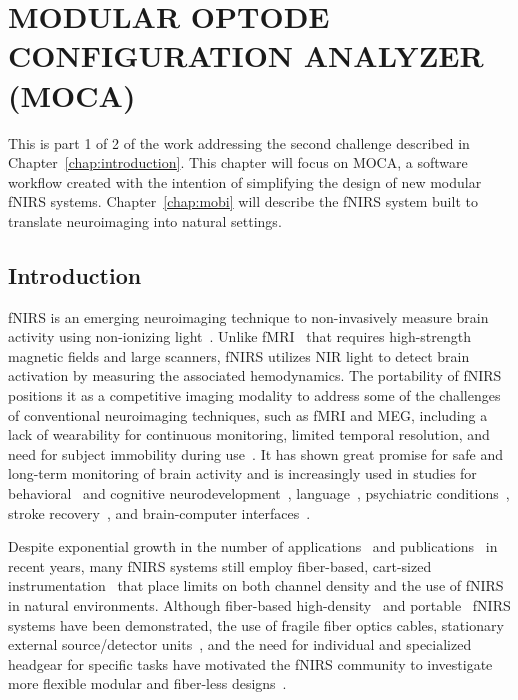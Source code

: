 
\chapter{MODULAR OPTODE CONFIGURATION ANALYZER (MOCA)} %
\label{chap:moca}
This is part 1 of 2 of the work addressing the second challenge described in Chapter~\ref{chap:introduction}. This chapter will focus on \ac{MOCA}, a software workflow created with the intention of simplifying the design of new modular \ac{fNIRS} systems. Chapter~\ref{chap:mobi} will describe the \ac{fNIRS} system built to translate neuroimaging into natural settings. 

\section{Introduction}
\label{chap:moca:introduction}
\ac{fNIRS} is an emerging neuroimaging technique to non-invasively measure brain activity using non-ionizing light~\cite{Ferrari2012}. Unlike \ac{fMRI}~\cite{Heinzel2013} that requires high-strength magnetic fields and large scanners, \ac{fNIRS} utilizes \ac{NIR} light to detect brain activation by measuring the associated hemodynamics. The portability of \ac{fNIRS} positions it as a competitive imaging modality to address some of the challenges of conventional neuroimaging techniques, such as \ac{fMRI} and \ac{MEG}, including a lack of wearability for continuous monitoring, limited temporal resolution, and need for subject immobility during use~\cite{Yucel2017}. It has shown great promise for safe and long-term monitoring of brain activity and is increasingly used in studies for behavioral~\cite{McDonald2018} and cognitive neurodevelopment~\cite{Aslin2015, Vanderwert2014, Wilcox2015, Soltanlou2018}, language~\cite{Quaresima2012, Rossi2012}, psychiatric conditions~\cite{Ehlis2014, Kumar2017}, stroke recovery~\cite{Yang2019}, and brain-computer interfaces~\cite{Naseer2015, Ahn2017, Hong2018}. 

Despite exponential growth in the number of applications~\cite{Boas2014, Quaresima2019} and publications~\cite{Yucel2017} in recent years, many \ac{fNIRS} systems still employ fiber-based, cart-sized instrumentation~\cite{Scholkmann2014} that place limits on both channel density and the use of \ac{fNIRS} in natural environments. Although fiber-based high-density~\cite{Eggebrecht2014} and portable~\cite{Wheelock2019} \ac{fNIRS} systems have been demonstrated, the use of fragile fiber optics cables, stationary external source/detector units~\cite{Oxymon2017, Techen2018}, and the need for individual and specialized headgear for specific tasks have motivated the \ac{fNIRS} community to investigate more flexible modular and fiber-less designs~\cite{Zhao2017, Curtin2018}.

